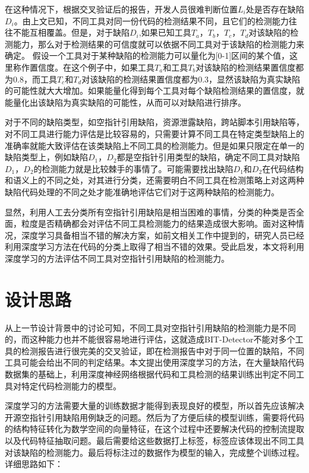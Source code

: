 在这种情况下，根据交叉验证后的报告，开发人员很难判断位置$L_i$处是否存在缺陷$D_i$。由上文已知，不同工具对同一份代码的检测结果不同，且它们的检测能力往往不能互相覆盖。但是，对于缺陷$D_i$,如果已知工具$T_a$，$T_b$，$T_c$，$T_d$对该缺陷的检测能力，那么对于检测结果的可信度就可以依据不同工具对于该缺陷的检测能力来确定。
假设一个工具对于某种缺陷的检测能力可以量化为[0-1]区间的某个值，这里称作置信度。在这个例子中，如果工具$T_a$和工具$T_b$对该缺陷的检测结果置信度都为0.8，而工具$T_c$和$T_d$对该缺陷的检测结果置信度都为0.3，显然该缺陷为真实缺陷的可能性就大大增加。如果能量化得到每个工具对每个缺陷检测结果的置信度，就能量化出该缺陷为真实缺陷的可能性，从而可以对缺陷进行排序。

对于不同的缺陷类型，如空指针引用缺陷，资源泄露缺陷，跨站脚本引用缺陷等，对不同工具进行能力评估是比较容易的，只需要计算不同工具在特定类型缺陷上的准确率就能大致评估在该类缺陷上不同工具的检测能力。但是如果只限定在单一的缺陷类型上，例如缺陷$D_1$，$D_2$都是空指针引用类型的缺陷，确定不同工具对缺陷$D_1$，$D_2$的检测能力就是比较棘手的事情了。可能需要找出缺陷$D_1$和$D_2$在代码结构和语义上的不同之处，对其进行分类，还需要明白不同工具在检测策略上对这两种缺陷代码处理的不同之处才能准确地评估它们对于这两种缺陷的检测能力。

显然，利用人工去分类所有空指针引用缺陷是相当困难的事情，分类的种类是否全面，粒度是否精确都会对评估不同工具检测能力的结果造成很大影响。面对这种情况，深度学习具备相当不错的解决方案，如前文相关工作中提到的，研究人员已经利用深度学习方法在代码的分类上取得了相当不错的效果。受此启发，本文将利用深度学习的方法评估不同工具对空指针引用缺陷的检测能力。

\section{设计思路}
从上一节设计背景中的讨论可知，不同工具对空指针引用缺陷的检测能力是不同的，而这种能力也并不能很容易地进行评估，这就造成BIT-Detector不能对多个工具的检测报告进行很完美的交叉验证，即在检测报告中对于同一位置的缺陷，不同工具可能会给出不同的判定结果。本文提出使用深度学习的方法，在大量缺陷代码数据集的基础上，利用深度神经网络根据代码和工具检测的结果训练出判定不同工具对特定代码检测能力的模型。

深度学习的方法需要大量的训练数据才能得到表现良好的模型，所以首先应该解决开源空指针引用缺陷用例缺乏的问题。然后为了方便后续的模型训练，需要将代码的结构特征转化为数学空间的向量特征，在这个过程中还要解决代码的控制流提取以及代码特征抽取问题。最后需要给这些数据打上标签，标签应该体现出不同工具对该缺陷的检测能力。最后将标注过的数据作为模型的输入，完成整个训练过程。详细思路如下：

